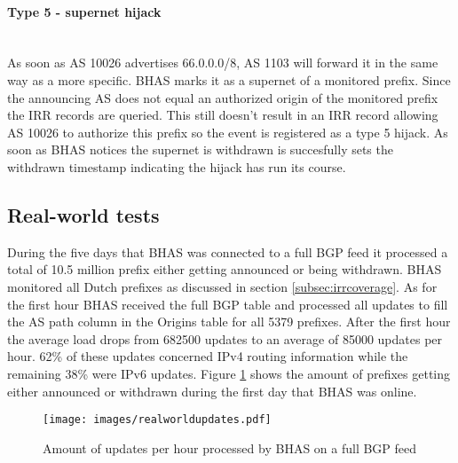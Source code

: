 \paragraph{Type 5 - supernet hijack}\mbox{}\\
As soon as AS 10026 advertises 66.0.0.0/8, AS 1103 will forward it in the same way as a more specific. BHAS marks it as a supernet of a monitored prefix. Since the announcing AS does not equal an authorized origin of the monitored prefix the IRR records are queried. This still doesn't result in an IRR record allowing AS 10026 to authorize this prefix so the event is registered as a type 5 hijack. As soon as BHAS notices the supernet is withdrawn is succesfully sets the withdrawn timestamp indicating the hijack has run its course.

\subsection{Real-world tests}\label{subsec:realworld}
During the five days that BHAS was connected to a full BGP feed it processed a total of 10.5 million prefix either getting announced or being withdrawn. BHAS monitored all Dutch prefixes as discussed in section \ref{subsec:irrcoverage}. As for the first hour BHAS received the full BGP table and processed all updates to fill the AS path column in the Origins table for all 5379 prefixes. After the first hour the average load drops from 682500 updates to an average of 85000 updates per hour. 62\% of these updates concerned IPv4 routing information while the remaining 38\% were IPv6 updates. Figure \ref{fig:realworldupdates} shows the amount of prefixes getting either announced or withdrawn during the first day that BHAS was online.\par

\begin{figure}[h]
    \centering
    \texttt{[image: images/realworldupdates.pdf]}
    \caption{Amount of updates per hour processed by BHAS on a full BGP feed}
    \label{fig:realworldupdates}
\end{figure}

